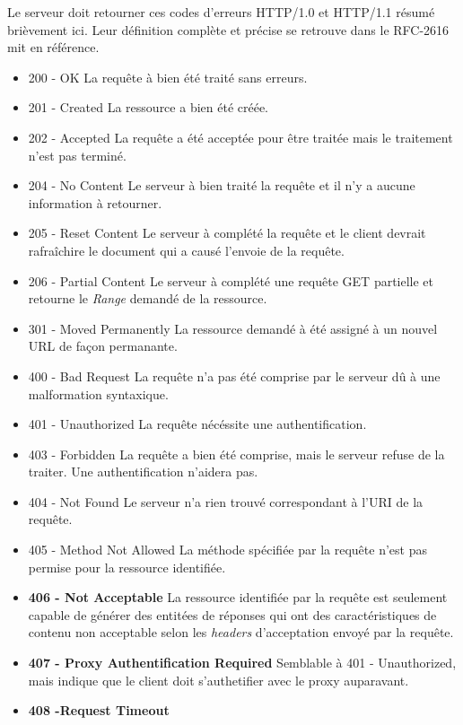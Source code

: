 \documentclass{scrreprt}
\begin{document}
\begin{itemizen}
Le serveur doit retourner ces codes d'erreurs HTTP/1.0 et HTTP/1.1 résumé brièvement ici. Leur définition complète et précise se retrouve dans le RFC-2616 mit en référence. \\
 \begin{itemize}
 \item 200 - OK
 \subitem La requête à bien été traité sans erreurs.
 \item 201 - Created
 \subitem La ressource a bien été créée.
 \item 202 - Accepted
 \subitem La requête a été acceptée pour être traitée mais le traitement n'est pas terminé.
 \item 204 - No Content
 \subitem Le serveur à bien traité la requête et il n'y a aucune information à retourner.
 \item 205 - Reset Content
 \subitem Le serveur à complété la requête et le client devrait rafraîchire le document qui a causé l'envoie de la requête.
 \item 206 - Partial Content
 \subitem Le serveur à complété une requête GET partielle et retourne le \textit{Range} demandé de la ressource.
 \item 301 - Moved Permanently
 \subitem La ressource demandé à été assigné à un nouvel URL de façon permanante.
 \item 400 - Bad Request
 \subitem La requête n'a pas été comprise par le serveur dû à une malformation syntaxique. 
 \item 401 - Unauthorized
 \subitem La requête nécéssite une authentification.
 \item 403 - Forbidden
 \subitem La requête a bien été comprise, mais le serveur refuse de la traiter. Une authentification n'aidera pas.
 \item 404 - Not Found
 \subitem Le serveur n'a rien trouvé correspondant à l'URI de la requête.
 \item 405 - Method Not Allowed
 \subitem La méthode spécifiée par la requête n'est pas permise pour la ressource identifiée.
 \item \textbf{406 - Not Acceptable}
 \subitem La ressource identifiée par la requête est seulement capable de générer des entitées de réponses qui ont des caractéristiques de contenu non acceptable selon les \textit{headers} d'acceptation envoyé par la requête.
 \item \textbf{407 - Proxy Authentification Required}
 \subitem Semblable à 401 - Unauthorized, mais indique que le client doit s'authetifier avec le proxy auparavant.
 \item \textbf{408 -Request Timeout}

\end{itemize}
\end{itemizen}
\end{document}
